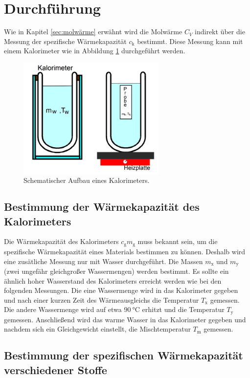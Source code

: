 \section{Durchführung}
\label{sec:Durchführung}

Wie in Kapitel \ref{sec:molwärme} erwähnt wird die Molwärme $C_V$ indirekt über die Messung der spezifische Wärmekapazität $c_\text{k}$ bestimmt.
Diese Messung kann mit einem Kalorimeter wie in Abbildung \ref{fig:abb1} durchgeführt werden.
\begin{figure}
\centering
\includegraphics[height=6.0cm]{data/abb1.png}
\caption{Schematischer Aufbau eines Kalorimeters. \cite{V201}}
\label{fig:abb1}
\end{figure}

\subsection{Bestimmung der Wärmekapazität des Kalorimeters}
\label{sec:Durchführung_Kalo}

Die Wärmekapazität des Kalorimeters $c_\text{g} m_\text{g}$ muss bekannt sein, um die spezifische Wärmekapazität eines Materials bestimmen zu können.
Deshalb wird eine zusätliche Messung nur mit Wasser durchgeführt.
Die Massen $m_\text{x}$ und $m_\text{y}$ (zwei ungefähr gleichgroßer Wassermengen) werden bestimmt.
Es sollte ein ähnlich hoher Wasserstand des Kalorimeters erreicht werden wie bei den folgenden Messungen.
Die eine Wassermenge wird in das Kalorimeter gegeben und nach einer kurzen Zeit des Wärmeausgleichs die Temperatur $T_\text{x}$ gemessen.
Die andere Wassermenge wird auf etwa $\SI{90}{\celsius}$ erhitzt und die Temperatur $T_\text{y}$ gemessen.
Anschließend wird das warme Wasser in das Kalorimeter gegeben und nachdem sich ein Gleichgewicht einstellt, die Mischtemperatur $T_\text{m}$ gemessen.

\subsection{Bestimmung der spezifischen Wärmekapazität verschiedener Stoffe}
\label{sec:Durchführung_Stoffe}

